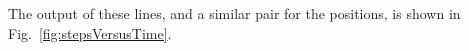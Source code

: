 The output of these lines, and a similar pair for the positions, is shown in Fig.~\ref{fig:stepsVersusTime}.